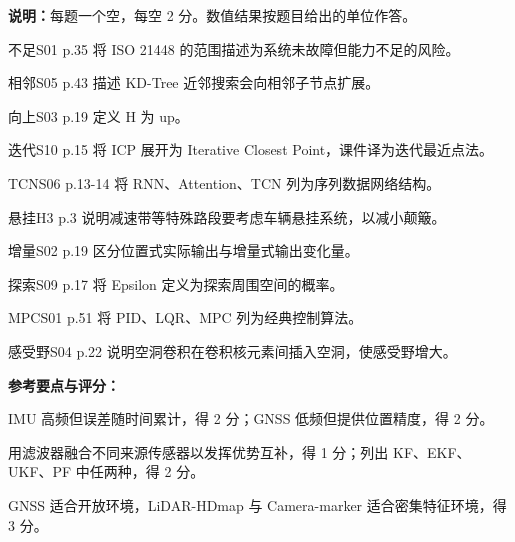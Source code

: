 \exampagebreak
{}
\textbf{说明：}每题一个空，每空 2 分。数值结果按题目给出的单位作答。

{不足}{S01 p.35 将 ISO 21448 的范围描述为系统未故障但能力不足的风险。}

{相邻}{S05 p.43 描述 KD-Tree 近邻搜索会向相邻子节点扩展。}

{向上}{S03 p.19 定义 H 为 up。}

{迭代}{S10 p.15 将 ICP 展开为 Iterative Closest Point，课件译为迭代最近点法。}

{TCN}{S06 p.13-14 将 RNN、Attention、TCN 列为序列数据网络结构。}

{悬挂}{H3 p.3 说明减速带等特殊路段要考虑车辆悬挂系统，以减小颠簸。}

{增量}{S02 p.19 区分位置式实际输出与增量式输出变化量。}

{探索}{S09 p.17 将 Epsilon 定义为探索周围空间的概率。}

{MPC}{S01 p.51 将 PID、LQR、MPC 列为经典控制算法。}

{感受野}{S04 p.22 说明空洞卷积在卷积核元素间插入空洞，使感受野增大。}

\exampagebreak
{}

{\textbf{参考要点与评分：}
\begin{subquestions}
\item IMU 高频但误差随时间累计，得 2 分；GNSS 低频但提供位置精度，得 2 分。
\item 用滤波器融合不同来源传感器以发挥优势互补，得 1 分；列出 KF、EKF、UKF、PF 中任两种，得 2 分。
\item GNSS 适合开放环境，LiDAR-HDmap 与 Camera-marker 适合密集特征环境，得 3 分。
\end{subquestions}}

